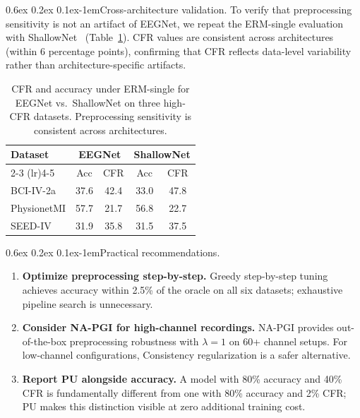 \documentclass{article}
\makeatletter
\renewcommand{\paragraph}{\@startsection{paragraph}{4}{\z@}%
  {0.6ex \@plus 0.2ex \@minus 0.1ex}{-1em}{\normalsize\bf}}
\makeatother
\begin{document}
\paragraph{Cross-architecture validation.}
To verify that preprocessing sensitivity is not an artifact of EEGNet, we repeat the ERM-single evaluation with ShallowNet~\citep{schirrmeister2017deep} (Table~\ref{tab:shallow}). CFR values are consistent across architectures (within 6 percentage points), confirming that CFR reflects data-level variability rather than architecture-specific artifacts.

\begin{table}[h]
\centering
\caption{CFR and accuracy under ERM-single for EEGNet vs.\ ShallowNet on three high-CFR datasets. Preprocessing sensitivity is consistent across architectures.}
\label{tab:shallow}
\small
\begin{tabular}{@{}lcccc@{}}
\toprule
Dataset & \multicolumn{2}{c}{EEGNet} & \multicolumn{2}{c}{ShallowNet} \\
\cmidrule(lr){2-3} \cmidrule(lr){4-5}
 & Acc & CFR & Acc & CFR \\
\midrule
BCI-IV-2a & 37.6 & 42.4 & 33.0 & 47.8 \\
PhysionetMI & 57.7 & 21.7 & 56.8 & 22.7 \\
SEED-IV & 31.9 & 35.8 & 31.5 & 37.5 \\
\bottomrule
\end{tabular}
\end{table}

\paragraph{Practical recommendations.}
\begin{enumerate}[nosep,leftmargin=*]
\item \textbf{Optimize preprocessing step-by-step.} Greedy step-by-step tuning achieves accuracy within 2.5\% of the oracle on all six datasets; exhaustive pipeline search is unnecessary.
\item \textbf{Consider NA-PGI for high-channel recordings.} NA-PGI provides out-of-the-box preprocessing robustness with $\lambda{=}1$ on 60+ channel setups. For low-channel configurations, Consistency regularization is a safer alternative.
\item \textbf{Report PU alongside accuracy.} A model with 80\% accuracy and 40\% CFR is fundamentally different from one with 80\% accuracy and 2\% CFR; PU makes this distinction visible at zero additional training cost.
\end{enumerate}
\end{document}
